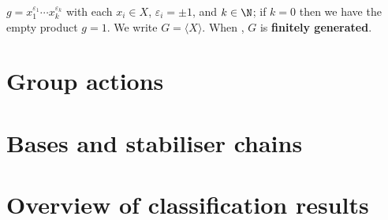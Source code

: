  $g = x_1^{\varepsilon_1}\dotsb x_k^{\varepsilon_k}$ with each $x_i \in X$, $\varepsilon_i = \pm 1$, and $k \in \N$; if $k = 0$ then we have the empty product $g = 1$. We write $G = \langle X \rangle$. When , $G$ is \textbf{finitely generated}. 


\section{Group actions}



\section{Bases and stabiliser chains}\label{sec:bases_stabiliser_chains}



\section{Overview of classification results}

